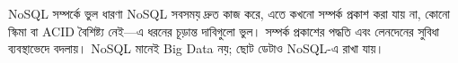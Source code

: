 \begin{mistakebox}{NoSQL সম্পর্কে ভুল ধারণা}
NoSQL সবসময় দ্রুত কাজ করে, এতে কখনো সম্পর্ক প্রকাশ করা যায় না, কোনো স্কিমা বা ACID বৈশিষ্ট্য নেই—এ ধরনের চূড়ান্ত দাবিগুলো ভুল। সম্পর্ক প্রকাশের পদ্ধতি এবং লেনদেনের সুবিধা ব্যবস্থাভেদে বদলায়। NoSQL মানেই Big Data নয়; ছোট ডেটাও NoSQL-এ রাখা যায়।
\end{mistakebox}
